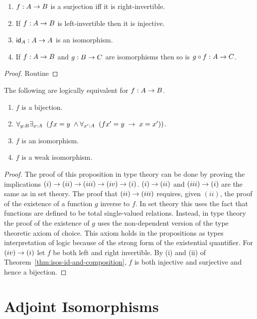 \begin{thm}\label{thm:isos-id-and-composition} $\;$
\begin{enumerate}
\item $f:A\ra B$ is a surjection iff it is right-invertible.
\item If $f:A\ra B$ is left-invertible then it is injective.
\item $\idfunc[A]:A\ra A$ is an isomorphism.
\item If $f:A\ra B$ and $g:B\ra C$ are isomorphisms then so is $g\circ f:A\ra C$.
\end{enumerate}
\end{thm}
\begin{proof} Routine
\end{proof}
\begin{thm}\label{thm:bijections-isos}
The following are logically equivalent for $f:A\ra B$.
\begin{enumerate}
\item $f$ is a bijection.
\item $\forall_{y:B}\exists_{x:A}\;\; (fx=y\;\wedge \forall_{x':A}\;\; (fx'=y\;\ra\; x=x'))$.
\item $f$ is an isomorphism.
\item $f$ is a weak isomorphism.
\end{enumerate}
\end{thm}
\begin{proof}
The proof of this proposition in type theory can be done by proving the implications $(i)\ra (ii)\ra (iii)\ra (iv)\ra (i)$.  $(i)\ra (ii)$ and $(iii)\ra (i)$ are the same as in set theory.  The proof that $(ii)\ra (iii)$ requires, given $(ii)$, the proof of the existence of a function $g$ inverse to $f$.  In set theory this uses the fact that functions are defined to be total single-valued relations.  Instead, in type theory the proof of the existence of $g$
uses the non-dependent version of the type theoretic axiom of choice.  This axiom holds in the propositions as types interpretation of logic because of the strong form of the existential quantifier.  For $(iv)\ra (i)$ let $f$ be both left and right invertible.  By (i) and (ii) of Theorem~\ref{thm:isos-id-and-composition}, $f$ is both injective and surjective and hence a bijection.  
\end{proof}
\newpage

\section{Adjoint  Isomorphisms}

